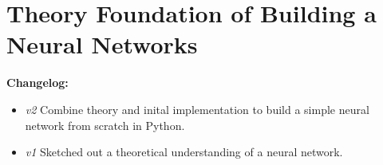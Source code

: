 \chapter{Theory Foundation of Building a Neural Networks}

\setcounter{section}{0}

\textbf{Changelog:}\\
\begin{itemize}
	\item \textit{v2}  Combine theory and inital implementation to build a simple neural network from scratch in Python.
	\item \textit{v1}  Sketched out a theoretical understanding of a neural network.
\end{itemize}

\pagebreak
